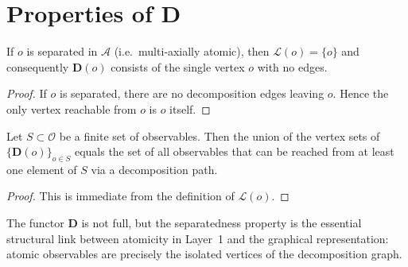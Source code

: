 \section{Properties of \(\mathbf{D}\)}\label{sec:properties}

\begin{lemma}\label{lem:separated_map}
If \(o\) is separated in \(\mathcal{A}\) (i.e.\ multi‑axially atomic), then \(\mathcal{L}(o) = \{o\}\) and consequently \(\mathbf{D}(o)\) consists of the single vertex \(o\) with no edges.
\end{lemma}
\begin{proof}
If \(o\) is separated, there are no decomposition edges leaving \(o\). Hence the only vertex reachable from \(o\) is \(o\) itself.
\end{proof}

\begin{lemma}\label{lem:union}
Let \(S \subset \mathcal{O}\) be a finite set of observables.
Then the union of the vertex sets of \(\{\mathbf{D}(o)\}_{o \in S}\) equals the set of all observables that can be reached from at least one element of \(S\) via a decomposition path.
\end{lemma}
\begin{proof}
This is immediate from the definition of \(\mathcal{L}(o)\).
\end{proof}

The functor \(\mathbf{D}\) is not full, but the separatedness property is the essential structural link between atomicity in Layer~1 and the graphical representation: atomic observables are precisely the isolated vertices of the decomposition graph.